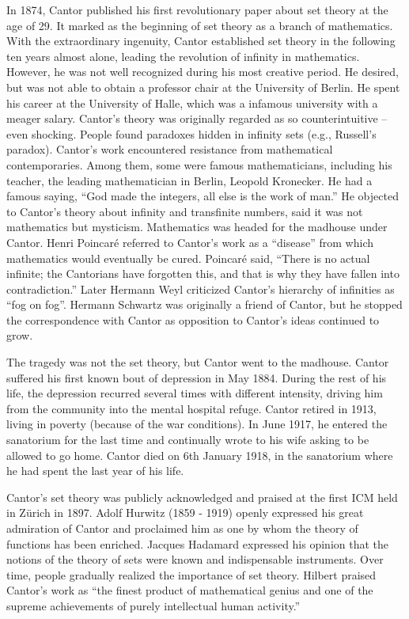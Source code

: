 \documentclass[b5paper]{article}
\begin{document}
\begin{mdframed}
In 1874, Cantor published his first revolutionary paper about set theory at the age of 29. It marked as the beginning of set theory as a branch of mathematics. With the extraordinary ingenuity, Cantor established set theory in the following ten years almost alone, leading the revolution of infinity in mathematics. However, he was not well recognized during his most creative period. He desired, but was not able to obtain a professor chair at the University of Berlin. He spent his career at the University of Halle, which was a infamous university with a meager salary. Cantor's theory was originally regarded as so counterintuitive – even shocking. People found paradoxes hidden in infinity sets (e.g., Russell's paradox). Cantor's work encountered resistance from mathematical contemporaries. Among them, some were famous mathematicians, including his teacher, the leading mathematician in Berlin, Leopold Kronecker. He had a famous saying, \enquote{God made the integers, all else is the work of man.} He objected to Cantor's theory about infinity and transfinite numbers, said it was not mathematics but mysticism. Mathematics was headed for the madhouse under Cantor. Henri Poincaré referred to Cantor's work as a \enquote{disease} from which mathematics would eventually be cured. Poincaré said, \enquote{There is no actual infinite; the Cantorians have forgotten this, and that is why they have fallen into contradiction.} Later Hermann Weyl criticized Cantor's hierarchy of infinities as \enquote{fog on fog}. Hermann Schwartz was originally a friend of Cantor, but he stopped the correspondence with Cantor as opposition to Cantor's ideas continued to grow.

The tragedy was not the set theory, but Cantor went to the madhouse. Cantor suffered his first known bout of depression in May 1884. During the rest of his life, the depression recurred several times with different intensity, driving him from the community into the mental hospital refuge.
Cantor retired in 1913, living in poverty (because of the war conditions). In June 1917, he entered the sanatorium for the last time and continually wrote to his wife asking to be allowed to go home. Cantor died on 6th January 1918, in the sanatorium where he had spent the last year of his life.

Cantor's set theory was publicly acknowledged and praised at the first ICM held in Zürich in 1897. Adolf Hurwitz (1859 - 1919) openly expressed his great admiration of Cantor and proclaimed him as one by whom the theory of functions has been enriched. Jacques Hadamard expressed his opinion that the notions of the theory of sets were known and indispensable instruments. Over time, people gradually realized the importance of set theory. Hilbert praised Cantor's work as \enquote{the finest product of mathematical genius and one of the supreme achievements of purely intellectual human activity.}
\end{mdframed}
\end{document}
